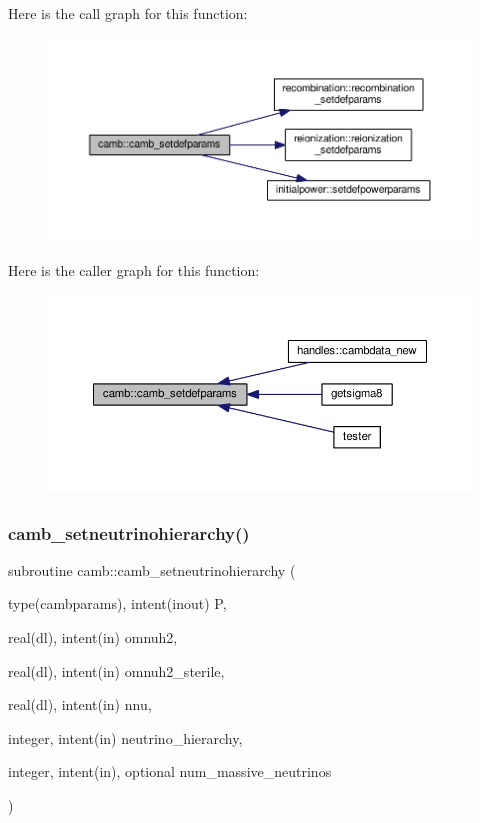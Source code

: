 Here is the call graph for this function\+:
\nopagebreak
\begin{figure}[H]
\begin{center}
\leavevmode
\includegraphics[width=350pt]{namespacecamb_a6ce30ab6419006324d56d3e4434530f9_cgraph}
\end{center}
\end{figure}
Here is the caller graph for this function\+:
\nopagebreak
\begin{figure}[H]
\begin{center}
\leavevmode
\includegraphics[width=350pt]{namespacecamb_a6ce30ab6419006324d56d3e4434530f9_icgraph}
\end{center}
\end{figure}
\mbox{\label{namespacecamb_ad303911c183f5affcdc9665c5facdd4b}} 
\subsubsection{\texorpdfstring{camb\+\_\+setneutrinohierarchy()}{camb\_setneutrinohierarchy()}}
{\footnotesize\ttfamily subroutine camb\+::camb\+\_\+setneutrinohierarchy (\begin{DoxyParamCaption}\item[{type(cambparams), intent(inout)}]{P,  }\item[{real(dl), intent(in)}]{omnuh2,  }\item[{real(dl), intent(in)}]{omnuh2\+\_\+sterile,  }\item[{real(dl), intent(in)}]{nnu,  }\item[{integer, intent(in)}]{neutrino\+\_\+hierarchy,  }\item[{integer, intent(in), optional}]{num\+\_\+massive\+\_\+neutrinos }\end{DoxyParamCaption})}



